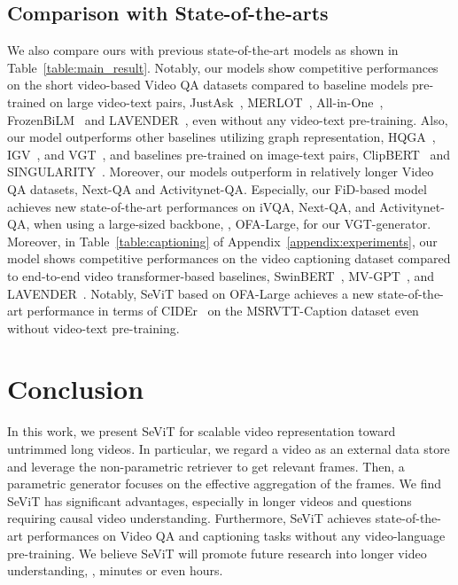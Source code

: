 \documentclass{article}
\newcommand{\frameworkname}{SeViT}
\begin{document}
\subsection{Comparison with State-of-the-arts}


We also compare ours with previous state-of-the-art models as shown in Table~\ref{table:main_result}. Notably, our models show competitive performances on the short video-based Video QA datasets compared to baseline models pre-trained on large video-text pairs, JustAsk~\cite{yang2021just}, MERLOT~\cite{zellers2021merlot}, All-in-One~\cite{wang2022all}, FrozenBiLM~\cite{yang2022zero} and LAVENDER~\cite{li2022lavender}, even without any video-text pre-training. Also, our model outperforms other baselines utilizing graph representation, HQGA~\cite{xiao2022video}, IGV~\cite{li2022invariant}, and VGT~\cite{xiao2022videotransformer}, and baselines pre-trained on image-text pairs, ClipBERT~\cite{lei2021less} and SINGULARITY~\cite{lei2022revealing}. Moreover, our models outperform in relatively longer Video QA datasets, Next-QA and Activitynet-QA. Especially, our FiD-based model achieves new state-of-the-art performances on iVQA, Next-QA, and Activitynet-QA, when using a large-sized backbone, \ie, OFA-Large, for our VGT-generator. Moreover, in Table~\ref{table:captioning} of Appendix~\ref{appendix:experiments}, our model shows competitive performances on the video captioning dataset compared to end-to-end video transformer-based baselines, SwinBERT~\cite{lin2022swinbert}, MV-GPT~\cite{seo2022end}, and LAVENDER~\cite{ li2022lavender}. Notably, \frameworkname{} based on OFA-Large achieves a new state-of-the-art performance in terms of CIDEr~\cite{vedantam2015cider} on the MSRVTT-Caption dataset even without video-text pre-training.
 \section{Conclusion}

In this work, we present \frameworkname{} for scalable video representation toward untrimmed long videos. In particular, we regard a video as an external data store and leverage the non-parametric retriever to get relevant frames. Then, a parametric generator focuses on the effective aggregation of the frames. We find \frameworkname{} has significant advantages, especially in longer videos and questions requiring causal video understanding. Furthermore, \frameworkname{} achieves state-of-the-art performances on Video QA and captioning tasks without any video-language pre-training. We believe \frameworkname{} will promote future research into longer video understanding, \eg, minutes or even hours. 


\end{document}
